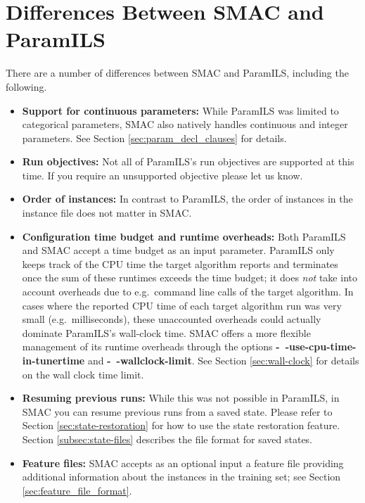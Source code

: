 \section{Differences Between SMAC and ParamILS}

There are a number of differences between SMAC and ParamILS, including the following.

\begin{itemize}
\item \textbf{Support for continuous parameters:} 
While ParamILS was limited to categorical parameters, SMAC also natively handles continuous and integer parameters. See Section \ref{sec:param_decl_clauses} for details.

\item \textbf{Run objectives:} 
Not all of ParamILS's run objectives are supported at this time. If you require an unsupported objective please let us know.

\item \textbf{Order of instances:} 
In contrast to ParamILS, the order of instances in the instance file does not matter in SMAC.

\item \textbf{Configuration time budget and runtime overheads:} 
Both ParamILS and SMAC accept a time budget as an input parameter. ParamILS only keeps track of the CPU time the target algorithm reports and terminates once the sum of these runtimes exceeds the time budget; it does \emph{not} take into account overheads due to e.g.\ command line calls of the target algorithm. In cases where the reported CPU time of each target algorithm run was very small (e.g.\ milliseconds), these unaccounted overheads could actually dominate ParamILS's wall-clock time.
SMAC offers a more flexible management of its runtime overheads through the options 
\textbf{-~$\!$-use-cpu-time-in-tunertime} and \textbf{-~$\!$-wallclock-limit}. See Section \ref{sec:wall-clock} for details on the wall clock time limit.

\item \textbf{Resuming previous runs:} 
While this was not possible in ParamILS, in SMAC you can resume previous runs from a saved state.
Please refer to Section \ref{sec:state-restoration} for how to use the state restoration feature. Section \ref{subsec:state-files} describes the file format for saved states.

\item \textbf{Feature files:} 
SMAC accepts as an optional input a feature file providing additional information about the instances in the training set; see Section \ref{sec:feature_file_format}.



\end{itemize}
